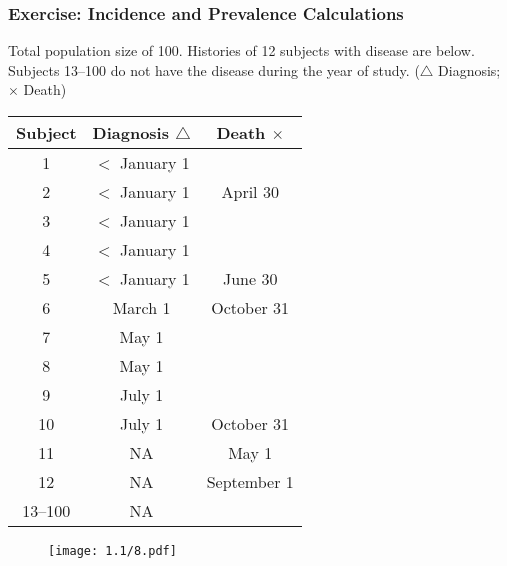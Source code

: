 \subsubsection*{Exercise: Incidence and Prevalence Calculations}
Total population size of 100. Histories of 12 subjects with disease are below. Subjects
13--100 do not have the disease during the year of study. ($ \triangle $ Diagnosis; $ \times $ Death)
\begin{table}[H]
    \centering
    \begin{tabular}{ccc}
        \toprule
        \textbf{Subject} & \textbf{Diagnosis} $ \triangle $ & \textbf{Death} $ \times $ \\
        \midrule
        1                & $<$ January 1                                                \\
        2                & $<$ January 1                    & April 30                  \\
        3                & $<$ January 1                                                \\
        4                & $<$ January 1                                                \\
        5                & $<$ January 1                    & June 30                   \\
        6                & March 1                          & October 31                \\
        7                & May 1                                                        \\
        8                & May 1                                                        \\
        9                & July 1                                                       \\
        10               & July 1                           & October 31                \\
        11               & NA                               & May 1                     \\
        12               & NA                               & September 1               \\
        13--100          & NA                                                           \\
        \bottomrule
    \end{tabular}
\end{table}
\begin{figure}[H]
    \centering
    \texttt{[image: 1.1/8.pdf]}
\end{figure}
